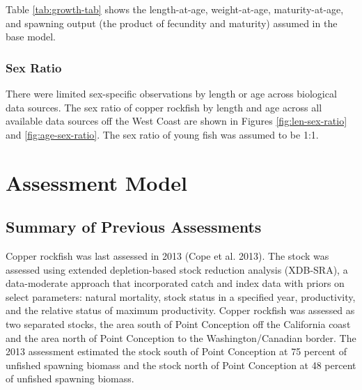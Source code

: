 \documentclass[11pt,
  english,
  a4paper,
]{article}
\begin{document}

Table \ref{tab:growth-tab} shows the length-at-age, weight-at-age, maturity-at-age, and spawning output (the product of fecundity and maturity) assumed in the base model.

\leavevmode\tagmcend\tagstructend\par


\hypertarget{sex-ratio}{%
\subsubsection{Sex Ratio}\label{sex-ratio}}

\leavevmode\tagmcend\tagstructend


There were limited sex-specific observations by length or age across biological data sources. The sex ratio of copper rockfish by length and age across all available data sources off the West Coast are shown in Figures \ref{fig:len-sex-ratio} and \ref{fig:age-sex-ratio}. The sex ratio of young fish was assumed to be 1:1.

\leavevmode\tagmcend\tagstructend\par

\clearpage


\hypertarget{assessment-model}{%
\section{Assessment Model}\label{assessment-model}}

\leavevmode\tagmcend\tagstructend


\hypertarget{summary-of-previous-assessments}{%
\subsection{Summary of Previous Assessments}\label{summary-of-previous-assessments}}

\leavevmode\tagmcend\tagstructend


Copper rockfish was last assessed in 2013 {(Cope et al. 2013)\leavevmode\tagmcend\tagstructend}. The stock was assessed using extended depletion-based stock reduction analysis (XDB-SRA), a data-moderate approach that incorporated catch and index data with priors on select parameters: natural mortality, stock status in a specified year, productivity, and the relative status of maximum productivity. Copper rockfish was assessed as two separated stocks, the area south of Point Conception off the California coast and the area north of Point Conception to the Washington/Canadian border. The 2013 assessment estimated the stock south of Point Conception at 75 percent of unfished spawning biomass and the stock north of Point Conception at 48 percent of unfished spawning biomass.
\end{document}
